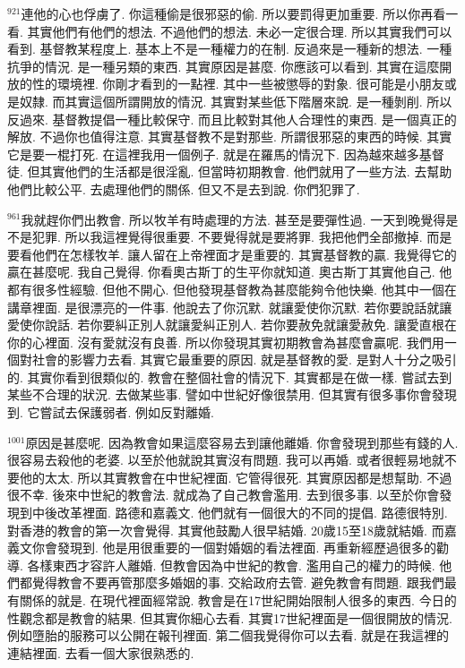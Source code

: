 \documentclass{book}
\begin{document}
$^{921}$連他的心也俘虜了.
你這種偷是很邪惡的偷.
所以要罰得更加重要.
所以你再看一看.
其實他們有他們的想法.
不過他們的想法.
未必一定很合理.
所以其實我們可以看到.
基督教某程度上.
基本上不是一種權力的在制.
反過來是一種新的想法.
一種抗爭的情況.
是一種另類的東西.
其實原因是甚麼.
你應該可以看到.
其實在這麼開放的性的環境裡.
你剛才看到的一點裡.
其中一些被懲辱的對象.
很可能是小朋友或是奴隸.
而其實這個所謂開放的情況.
其實對某些低下階層來說.
是一種剝削.
所以反過來.
基督教提倡一種比較保守.
而且比較對其他人合理性的東西.
是一個真正的解放.
不過你也值得注意.
其實基督教不是對那些.
所謂很邪惡的東西的時候.
其實它是要一棍打死.
在這裡我用一個例子.
就是在羅馬的情況下.
因為越來越多基督徒.
但其實他們的生活都是很淫亂.
但當時初期教會.
他們就用了一些方法.
去幫助他們比較公平.
去處理他們的關係.
但又不是去到說.
你們犯罪了.

$^{961}$我就趕你們出教會.
所以牧羊有時處理的方法.
甚至是要彈性過.
一天到晚覺得是不是犯罪.
所以我這裡覺得很重要.
不要覺得就是要將罪.
我把他們全部撤掉.
而是要看他們在怎樣牧羊.
讓人留在上帝裡面才是重要的.
其實基督教的贏.
我覺得它的贏在甚麼呢.
我自己覺得.
你看奧古斯丁的生平你就知道.
奧古斯丁其實他自己.
他都有很多性經驗.
但他不開心.
但他發現基督教為甚麼能夠令他快樂.
他其中一個在講章裡面.
是很漂亮的一件事.
他說去了你沉默.
就讓愛使你沉默.
若你要說話就讓愛使你說話.
若你要糾正別人就讓愛糾正別人.
若你要赦免就讓愛赦免.
讓愛直根在你的心裡面.
沒有愛就沒有良善.
所以你發現其實初期教會為甚麼會贏呢.
我們用一個對社會的影響力去看.
其實它最重要的原因.
就是基督教的愛.
是對人十分之吸引的.
其實你看到很類似的.
教會在整個社會的情況下.
其實都是在做一樣.
嘗試去到某些不合理的狀況.
去做某些事.
譬如中世紀好像很禁用.
但其實有很多事你會發現到.
它嘗試去保護弱者.
例如反對離婚.

$^{1001}$原因是甚麼呢.
因為教會如果這麼容易去到讓他離婚.
你會發現到那些有錢的人.
很容易去殺他的老婆.
以至於他就說其實沒有問題.
我可以再婚.
或者很輕易地就不要他的太太.
所以其實教會在中世紀裡面.
它管得很死.
其實原因都是想幫助.
不過很不幸.
後來中世紀的教會法.
就成為了自己教會濫用.
去到很多事.
以至於你會發現到中後改革裡面.
路德和嘉義文.
他們就有一個很大的不同的提倡.
路德很特別.
對香港的教會的第一次會覺得.
其實他鼓勵人很早結婚.
20歲15至18歲就結婚.
而嘉義文你會發現到.
他是用很重要的一個對婚姻的看法裡面.
再重新經歷過很多的勸導.
各樣東西才容許人離婚.
但教會因為中世紀的教會.
濫用自己的權力的時候.
他們都覺得教會不要再管那麼多婚姻的事.
交給政府去管.
避免教會有問題.
跟我們最有關係的就是.
在現代裡面經常說.
教會是在17世紀開始限制人很多的東西.
今日的性觀念都是教會的結果.
但其實你細心去看.
其實17世紀裡面是一個很開放的情況.
例如墮胎的服務可以公開在報刊裡面.
第二個我覺得你可以去看.
就是在我這裡的連結裡面.
去看一個大家很熟悉的.
\end{document}
